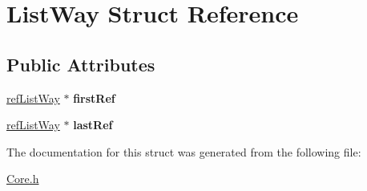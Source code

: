 \hypertarget{structListWay}{\section{List\-Way Struct Reference}
\label{structListWay}
}
\subsection*{Public Attributes}
\begin{DoxyCompactItemize}
\item 
\hypertarget{structListWay_a5864089678f85dee9cac7dcbb651c760}{\hyperlink{structrefListWay}{ref\-List\-Way} $\ast$ {\bfseries first\-Ref}}\label{structListWay_a5864089678f85dee9cac7dcbb651c760}

\item 
\hypertarget{structListWay_af314caeee839f16f5b489a0ec34cba44}{\hyperlink{structrefListWay}{ref\-List\-Way} $\ast$ {\bfseries last\-Ref}}\label{structListWay_af314caeee839f16f5b489a0ec34cba44}

\end{DoxyCompactItemize}


The documentation for this struct was generated from the following file\-:\begin{DoxyCompactItemize}
\item 
\hyperlink{Core_8h}{Core.\-h}\end{DoxyCompactItemize}
